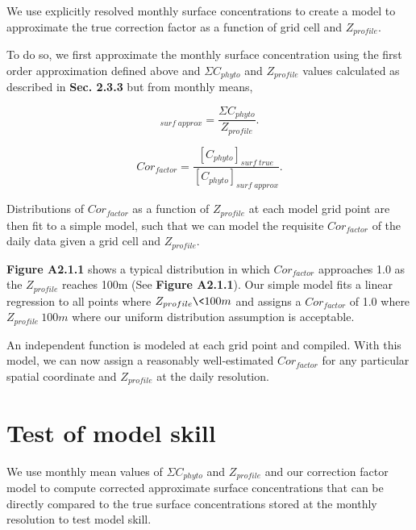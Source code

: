 We use explicitly resolved monthly surface concentrations to create a model to
approximate the true correction factor as a function of grid cell and $Z_{profile}$.

To do so, we first approximate the monthly surface concentration using the first
order approximation defined above and $\Sigma C_{phyto}$ and $Z_{profile}$ values calculated as described in \textbf{Sec. 2.3.3} but from monthly means,

\begin{equation}
    [C_{phyto}]_{surf \; approx} = \frac{\Sigma C_{phyto} }{Z_{profile}}.
\end{equation}



\begin{equation}
    Cor_{factor} = \frac{[C_{phyto}]_{surf \; true}}{[C_{phyto}]_{surf \; approx}} .
\end{equation}

Distributions of $Cor_{factor}$ as a function of $Z_{profile}$ at each model grid point are then fit to a simple model, such that we can model the requisite $Cor_{factor}$ of the daily data given a grid cell and $Z_{profile}$.

\textbf{Figure A2.1.1} shows a typical distribution in which $Cor_{factor}$ approaches 1.0 as the $Z_{profile}$ reaches 100m (See \textbf{Figure A2.1.1}). Our simple model fits a linear regression to all points where $Z_{profile} \< 100m$ and assigns a $Cor_{factor}$ of 1.0 where $Z_{profile} \>100m$ where our uniform distribution assumption is acceptable.

An independent function is modeled at each grid point and compiled. With this
model, we can now assign a reasonably well-estimated $Cor_{factor}$ for any particular
spatial coordinate and $Z_{profile}$ at the daily resolution.


\section{Test of model skill}

We use monthly mean values of $\Sigma C_{phyto}$ and $Z_{profile}$  and our correction factor model to compute corrected approximate surface concentrations that can be directly
compared to the true surface concentrations stored at the monthly resolution to test model skill.

